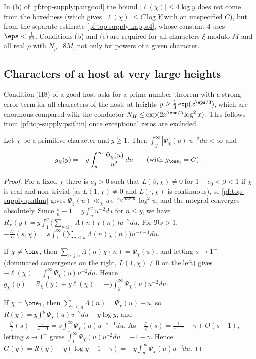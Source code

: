 \begin{remark}\label{pf:top-supply:pairex-remark}
In (b) of \cref{pf:top-supply:pairgood} the bound $|\ell(\chi)|\le4\log y$ does not come from the boxedness (which gives
$|\ell(\chi)|\le C\log Y$ with an unspecified $C$), but from the separate estimate \cref{pf:top-supply:kappa4}, whose
constant $4$ uses $\eps<\frac1{52}$. Conditions (b) and (c) are required for all characters $\xi$ modulo $M$ and all real
$\rho$ with $N_\rho\mid8M$, not only for powers of a given character.
\end{remark}

\subsection{Characters of a host at very large heights}\label{sec:pf:top-supply:thin}

Condition (H8) of a good host asks for a prime number theorem with a strong error term for all characters of the host,
at heights $y\ge\frac13\exp(x^{\eps/3})$, which are enormous compared with the conductor $N_H\le\exp(2x^{\eps/5}\log^2x)$.
This follows from \cref{pf:top-supply:psithin} once exceptional zeros are excluded.

\begin{lemma}\label{pf:top-supply:gintegral}
Let $\chi$ be a primitive character and $y\ge1$. Then $\int_y^\infty|\Psi_\chi(u)|u^{-2}du<\infty$ and
\[
g_\chi(y)=-y\int_y^\infty\frac{\Psi_\chi(u)}{u^2}\,du\qquad(\text{with }g_{\one_1}=G).
\]
 
\end{lemma}

\begin{proof}
For a fixed $\chi$ there is $c_0>0$ such that $L(\beta,\chi)\ne0$ for $1-c_0<\beta<1$ if $\chi$ is real and non-trivial
(as $L(1,\chi)\ne0$ and $L(\cdot,\chi)$ is continuous), so \cref{pf:top-supply:psithin} gives
$\Psi_\chi(u)\ll_\chi u\,e^{-c\sqrt{\log u}}\log^2u$, and the integral converges absolutely. Since
$\frac yn-1=y\int_n^yu^{-2}du$ for $n\le y$, we have $R_\chi(y)=y\int_1^y\big(\sum_{n\le u}\Lambda(n)\chi(n)\big)u^{-2}du$.
For $\Re s>1$, $-\frac{L'}L(s,\chi)=s\int_1^\infty\big(\sum_{n\le u}\Lambda(n)\chi(n)\big)u^{-s-1}du$.

If $\chi\ne\one$, then $\sum_{n\le u}\Lambda(n)\chi(n)=\Psi_\chi(u)$, and letting $s\to1^+$ (dominated convergence on the
right, $L(1,\chi)\ne0$ on the left) gives $-\ell(\chi)=\int_1^\infty\Psi_\chi(u)u^{-2}du$. Hence
$g_\chi(y)=R_\chi(y)+y\ell(\chi)=-y\int_y^\infty\Psi_\chi(u)u^{-2}du$.

If $\chi=\one_1$, then $\sum_{n\le u}\Lambda(n)=\Psi_\chi(u)+u$, so $R(y)=y\int_1^y\Psi_\chi(u)u^{-2}du+y\log y$, and
$-\frac{\zeta'}\zeta(s)-\frac s{s-1}=s\int_1^\infty\Psi_\chi(u)u^{-s-1}du$. As
$-\frac{\zeta'}\zeta(s)=\frac1{s-1}-\gamma+O(s-1)$, letting $s\to1^+$ gives $\int_1^\infty\Psi_\chi(u)u^{-2}du=-1-\gamma$.
Hence $G(y)=R(y)-y(\log y-1-\gamma)=-y\int_y^\infty\Psi_\chi(u)u^{-2}du$.
\end{proof}

